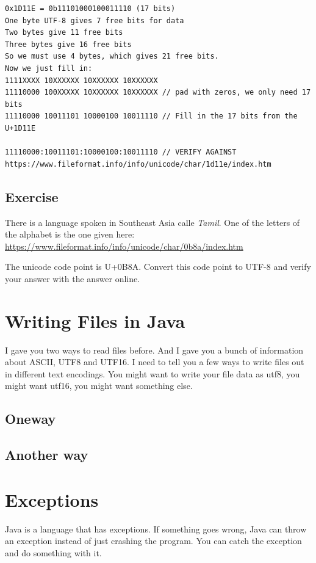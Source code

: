 \documentclass[12pt]{article}
\begin{document}
\begin{lstlisting}
0x1D11E = 0b11101000100011110 (17 bits)
One byte UTF-8 gives 7 free bits for data
Two bytes give 11 free bits
Three bytes give 16 free bits
So we must use 4 bytes, which gives 21 free bits.
Now we just fill in:
1111XXXX 10XXXXXX 10XXXXXX 10XXXXXX
11110000 100XXXXX 10XXXXXX 10XXXXXX // pad with zeros, we only need 17 bits
11110000 10011101 10000100 10011110 // Fill in the 17 bits from the U+1D11E

11110000:10011101:10000100:10011110 // VERIFY AGAINST https://www.fileformat.info/info/unicode/char/1d11e/index.htm
\end{lstlisting}


\subsection{Exercise}
There is a language spoken in Southeast Asia calle \textit{Tamil}.
One of the letters of the alphabet is the one given here: \url{https://www.fileformat.info/info/unicode/char/0b8a/index.htm}

The unicode code point is U+0B8A. Convert this code point to UTF-8 and verify your answer with the answer online.


\section{Writing Files in Java}
I gave you two ways to read files before. And I gave you a bunch of information
about ASCII, UTF8 and UTF16. I need to tell you a few ways to write files out in
different text encodings. You might want to write your file data as utf8, you
might want utf16, you might want something else.

\subsection{Oneway}


\subsection{Another way}



\section{Exceptions}
Java is a language that has exceptions. If something goes wrong, Java can throw
an exception instead of just crashing the program. You can catch the exception
and do something with it. 
\end{document}
